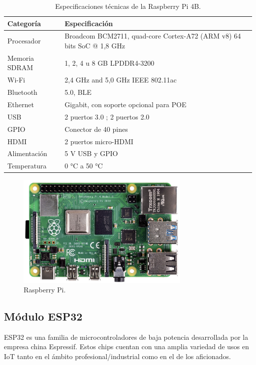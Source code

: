 \begin{table}[h]
\centering
\caption[Especificaciones técnicas de la Raspberry Pi 4B.]{Especificaciones técnicas de la Raspberry Pi 4B.}

\begin{tabular}{p{3cm} p{8cm}} 
\toprule
\textbf{Categoría} & \textbf{Especificación}\\

\midrule
Procesador	& Broadcom BCM2711, quad-core Cortex-A72 (ARM v8) 64 bits SoC @ 1,8 GHz \\
Memoria SDRAM	 & 1, 2, 4 u 8 GB LPDDR4-3200 \\
Wi-Fi	& 2,4 GHz and 5,0 GHz IEEE 802.11ac \\
Bluetooth	&  5.0, BLE \\
Ethernet	& Gigabit, con soporte opcional para POE\\
USB	& 2 puertos  3.0 ; 2 puertos 2.0\\
GPIO	&	Conector de 40 pines\\
HDMI	&  2 puertos micro-HDMI\\
Alimentación	& 5 V USB y GPIO\\
Temperatura	& 0 °C a 50 °C \\
\bottomrule
\hline
\end{tabular}
\label{tab:raspberrypi}
\end{table}
 
\begin{figure}[h]
	\centering
	\includegraphics[width=0.75\textwidth]{./Figures/rpi.png}
	\caption[Raspberry Pi.]{Raspberry Pi\protect\footnotemark.}
	\label{fig:rpi}
\end{figure}

\subsection{Módulo ESP32}
\label{sec:Módulo ESP32}
ESP32 es una familia de microcontroladores de baja potencia  desarrollada por la empresa china Espressif. Estos chips cuentan con una amplia variedad de usos en IoT tanto en el ámbito profesional/industrial como en el de los aficionados. 

